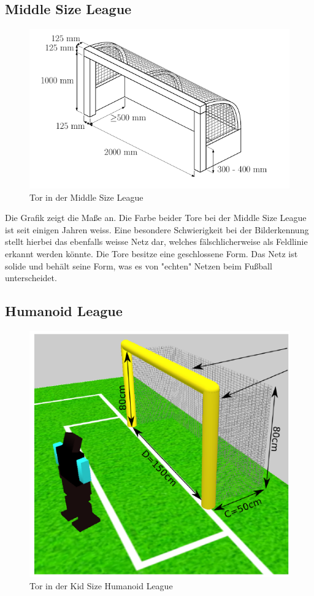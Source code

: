 \documentclass[a4paper,12pt]{article}
\begin{document}
\subsection{Middle Size League}

\begin{figure}[H]
\includegraphics{middlesize-goal.png}
\caption{Tor in der Middle Size League}
\label{fig:goal-msl}
\end{figure}

Die Grafik zeigt die Maße an. Die Farbe beider Tore bei der Middle Size League ist seit einigen
Jahren weiss. Eine besondere Schwierigkeit bei der Bilderkennung stellt hierbei das ebenfalls
weisse Netz dar, welches
fälschlicherweise als Feldlinie erkannt werden könnte. Die Tore besitze eine geschlossene Form. Das
Netz ist solide und behält seine Form, was es von "echten" Netzen beim Fußball unterscheidet.


\subsection{Humanoid League}
\begin{figure}[H]
\includegraphics{humanoid-kidsize-goal.png}
\caption{Tor in der Kid Size Humanoid League}
\label{fig:goal-human-kid}
\end{figure}
\end{document}
